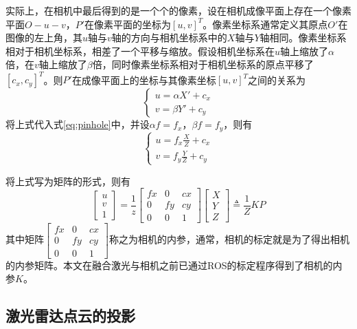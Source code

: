 实际上，在相机中最后得到的是一个个的像素，设在相机成像平面上存在一个像素平面$O-u-v$，$P'$在像素平面的坐标为$[u,v]^T$。像素坐标系通常定义其原点$O'$在图像的左上角，其$u$轴与$v$轴的方向与相机坐标系中的$X$轴与$Y$轴相同。像素坐标系相对于相机坐标系，相差了一个平移与缩放。假设相机坐标系在$u$轴上缩放了$\alpha$倍，在$v$轴上缩放了$\beta$倍，同时像素坐标系相对于相机坐标系的原点平移了$[c_x, c_y]^T$。则$P'$在成像平面上的坐标与其像素坐标$[u,v]^T$之间的关系为
\begin{equation}
    \left\{
        \begin{split}
            u = \alpha X' + c_x \\
            v = \beta Y' + c_y
        \end{split}
    \right.
\end{equation}
将上式代入式\ref{eq:pinhole}中，并设$\alpha f = f_x$，$\beta f = f_y$，则有
\begin{equation}
    \left\{
        \begin{split}
            u = f_x \frac{X}{Z} + c_x \\
            v = f_y \frac{Y}{Z} + c_y
        \end{split}
    \right.
\end{equation}

将上式写为矩阵的形式，则有
\begin{equation}
    \begin{bmatrix} u \\ v \\ 1
    \end{bmatrix}
    = \frac{1}{z} \begin{bmatrix} fx & 0 & cx \\ 0 & fy & cy \\ 0 & 0 &1 
    \end{bmatrix}
    \begin{bmatrix} X \\ Y \\ Z
    \end{bmatrix}
    \triangleq \frac{1}{Z}KP
    \label{camera_calib_eq}
\end{equation}
其中矩阵$\begin{bmatrix} fx & 0 & cx \\ 0 & fy & cy \\ 0 & 0 &1 
\end{bmatrix}$称之为相机的内参，通常，相机的标定就是为了得出相机的内参矩阵。本文在融合激光与相机之前已通过ROS的标定程序得到了相机的内参$K$。

\subsection{激光雷达点云的投影}

